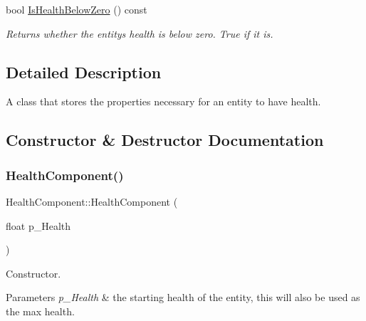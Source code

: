 \begin{DoxyCompactItemize}
\mbox{\label{class_health_component_a7ab1fa28ba3ddb000a69f29c06c786e2}} 
bool \mbox{\hyperlink{class_health_component_a7ab1fa28ba3ddb000a69f29c06c786e2}{Is\+Health\+Below\+Zero}} () const
\begin{DoxyCompactList}\small\item\em Returns whether the entity\textquotesingle{}s health is below zero. True if it is. \end{DoxyCompactList}\end{DoxyCompactItemize}


\subsection{Detailed Description}
A class that stores the properties necessary for an entity to have health. 

\subsection{Constructor \& Destructor Documentation}
\mbox{\label{class_health_component_a048219dc6ddcede021b49bb380838aca}} 
\subsubsection{\texorpdfstring{HealthComponent()}{HealthComponent()}\hspace{0.1cm}{\footnotesize\ttfamily [1/2]}}
{\footnotesize\ttfamily Health\+Component\+::\+Health\+Component (\begin{DoxyParamCaption}\item[{float}]{p\+\_\+\+Health }\end{DoxyParamCaption})\hspace{0.3cm}{\ttfamily [inline]}}



Constructor. 


\begin{DoxyParams}{Parameters}
{\em p\+\_\+\+Health} & the starting health of the entity, this will also be used as the max health. \\
\hline
\end{DoxyParams}
\mbox{\label{class_health_component_a6b29bbbe02c1217c7c3f40137b2c2967}} 
